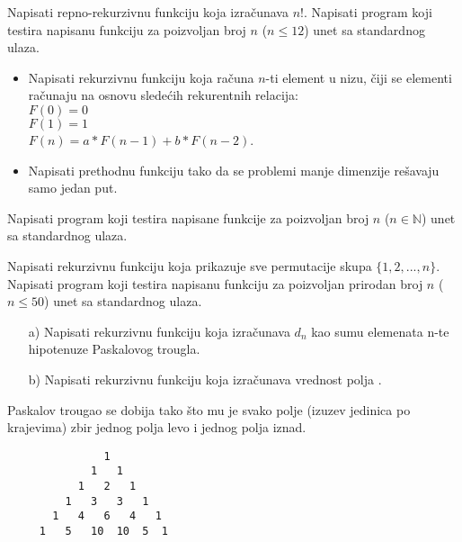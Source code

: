 \begin{Exercise}[label=105]
  Napisati repno-rekurzivnu funkciju koja izračunava $n!$. Napisati program koji testira napisanu funkciju za poizvoljan broj $n$ ($n \le 12$) unet sa standardnog ulaza.
\end{Exercise}
\begin{Answer}[ref=105]
\end{Answer}


\begin{Exercise}[label=106]
\begin{itemize}
\item Napisati rekurzivnu funkciju koja računa $n$-ti element u nizu, čiji se elementi računaju na osnovu sledećih rekurentnih relacija:\\
 $F(0) = 0$\\
 $F(1) = 1$\\
 $F(n) = a* F(n-1) + b*F(n-2)$.\\
\item Napisati prethodnu funkciju tako da se problemi manje dimenzije rešavaju samo jedan put.
\end{itemize}
  Napisati program koji testira napisane funkcije za poizvoljan broj $n$ ($n \in \mathbb N$) unet sa standardnog ulaza.
\end{Exercise}
\begin{Answer}[ref=106]
\end{Answer}

\begin{Exercise}[label=107]
Napisati rekurzivnu funkciju koja prikazuje sve permutacije skupa $\{1, 2, ... ,n\}$. Napisati program koji testira napisanu funkciju za poizvoljan prirodan broj $n$ ($n \le 50$) unet sa standardnog ulaza.
\end{Exercise}
\begin{Answer}[ref=107]
\end{Answer}

\begin{Exercise}[label=108]
\begin{itemize}
\item[a)] Napisati rekurzivnu funkciju koja izračunava $d_n$ kao sumu elemenata n-te hipotenuze Paskalovog trougla.
\item[b)] Napisati rekurzivnu funkciju koja izračunava vrednost polja .
\end{itemize}
 Paskalov trougao se dobija tako što mu je svako polje
(izuzev jedinica po krajevima) zbir jednog polja levo i
jednog polja iznad.
\begin{verbatim}
               1
             1   1
           1   2   1
         1   3   3   1
       1   4   6   4   1
     1   5   10  10  5  1
\end{verbatim}

\end{Exercise}
\begin{Answer}[ref=108]
\end{Answer}

